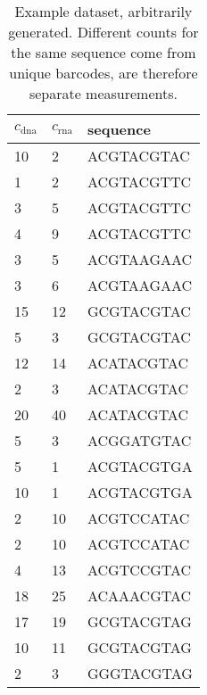 \begin{table}[]
    \centering
    \begin{tabular}{|l|l|l|}
    \hline
    $c_{\mathrm{dna}}$ & $c_{\mathrm{rna}}$ & sequence         \\ \hline
    10               & 2                & ACGTACGTAC\\ \hline
    1                & 2                & ACGTACGTTC\\ \hline
    3                & 5                & ACGTACGTTC\\ \hline
    4                & 9                & ACGTACGTTC\\ \hline
    3                & 5                & ACGTAAGAAC\\ \hline
    3                & 6                & ACGTAAGAAC\\ \hline
    15               & 12               & GCGTACGTAC\\ \hline
    5                 &3                & GCGTACGTAC\\ \hline
    12               & 14               & ACATACGTAC\\ \hline
    2                & 3                & ACATACGTAC\\ \hline
    20               & 40               & ACATACGTAC\\ \hline
    5                & 3                & ACGGATGTAC\\ \hline
    5                & 1                & ACGTACGTGA\\ \hline
    10               & 1                & ACGTACGTGA\\ \hline
    2                & 10               & ACGTCCATAC\\ \hline
    2                & 10               & ACGTCCATAC\\ \hline
    4                & 13               & ACGTCCGTAC\\ \hline
    18               & 25               & ACAAACGTAC\\ \hline
    17               & 19               & GCGTACGTAG\\ \hline
    10               & 11               & GCGTACGTAG\\ \hline
    2                & 3                & GGGTACGTAG\\ \hline    \end{tabular}
    \caption{Example dataset, arbitrarily generated. Different counts for the same sequence come from unique barcodes, are therefore separate measurements.}
    \label{tab:exaple_data}
\end{table}
